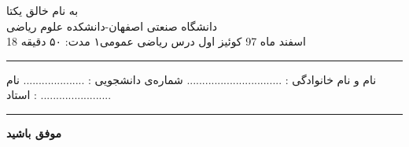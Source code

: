 \documentclass{article}
\begin{document}
{\bf 
\begin{center}         
{ \Large به نام خالق یکتا}\\
{ \Large دانشگاه صنعتی اصفهان-دانشکده علوم ریاضی}\\
{\large 
18 اسفند ماه 97 
\hspace*{2cm}
کوئیز اول درس ریاضی عمومی۱
 \hspace*{2cm}
 مدت: ۵۰ دقیقه
 }\end{center}}
\hrule height .5mm
\vspace{0.5cm}
\noindent
{ نام و نام خانوادگی : 
...............................}
{ شماره‌ی  دانشجویی 
  : ....................}
  { نام استاد :
.......................}
\vspace*{2mm}
\hrule height .5mm
\large
{}
 
\vfill
\centerline{ {\Large\bf موفق باشید}}
\end{document}
